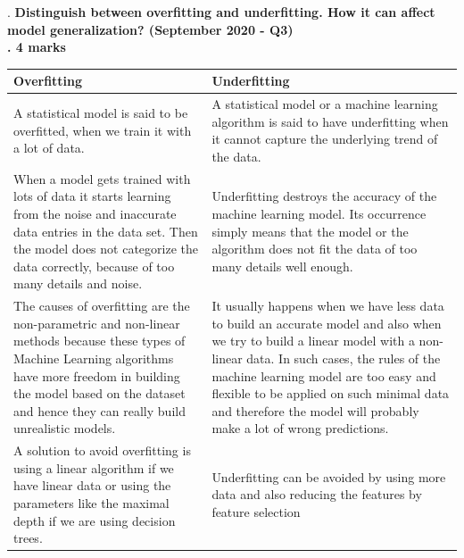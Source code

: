 .
\textbf{\textcolor{LightMagenta}{Distinguish between overfitting and underfitting. How it can affect model generalization? (September 2020 - Q3)
 \\. \hfill 4 marks}} \\[5pt]
 
\begin{tabular}{|p{7cm}|p{7cm}|}
    \hline
    Overfitting & Underfitting  \\ 
    \hline
    A statistical model is said to be overfitted, when we train it with a lot of data. & 
    A statistical model or a machine learning algorithm is said to have underfitting when it cannot capture the underlying trend of the data. \\
    \hline 
    
    When a model gets trained with lots of data it starts learning from the noise and inaccurate data entries in the data set. Then the model does not categorize the data correctly, because of too many details and noise. &
    Underfitting destroys the accuracy of the machine learning model. Its occurrence simply means that the model or the algorithm does not fit the data of too many details well enough.\\
    \hline
    
    The causes of overfitting are the non-parametric and non-linear methods because these types of Machine Learning algorithms have more freedom in building the model based on the dataset and hence they can really build unrealistic models. &
    It usually happens when we have less data to build an accurate model and also when we try to build a linear model with a non-linear data. In such cases, the rules of the machine learning model are too easy and flexible to be applied on such minimal data and therefore the model will probably make a lot of wrong predictions. \\
    \hline
    
    \hline
    A solution to avoid overfitting is using a linear algorithm if we have linear data or using the parameters like the maximal depth if we are using decision trees.& 
    Underfitting can be avoided by using more data and also reducing the features by feature selection\\
\hline
\end{tabular}


